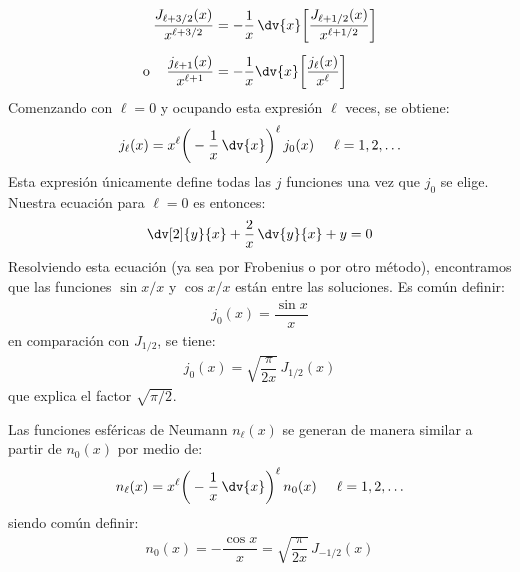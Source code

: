 \begin{align*}
\dfrac{J_{\ell+3/2} (x)}{x^{\ell+3/2}} &= - \dfrac{1}{x} \, \dv{x} \bigg[ \dfrac{J_{\ell+1/2} (x)}{x^{\ell+1/2}} \bigg] \\[0.5em]
\mbox{o } \hspace{0.3cm} \dfrac{j_{\ell+1} (x)}{x^{\ell+1}} &= - \dfrac{1}{x} \dv{x} \bigg[ \dfrac{j_{\ell} (x)}{x^{\ell}} \bigg]
\end{align*}
Comenzando con $\ell = 0$ y ocupando esta expresión $\ell$ veces, se obtiene:
\begin{align*}
j_{\ell} (x) = x^{\ell} \bigg( - \dfrac{1}{x} \, \dv{x} \bigg)^{\ell} \, j_{0} (x) \hspace{0.5cm} \ell = 1, 2, \ldots 
\end{align*}
Esta expresión únicamente define todas las $j$ funciones una vez que $j_{0}$ se elige. Nuestra ecuación para $\ell = 0$ es entonces:
\begin{align*}
\dv[2]{y}{x} + \dfrac{2}{x} \, \dv{y}{x} + y = 0
\end{align*}
Resolviendo esta ecuación (ya sea por Frobenius o por otro método), encontramos que las funciones $\sin x /x$ y $\cos x /x$ están entre las soluciones. Es común definir:
\begin{align*}
j_{0} (x) = \dfrac{\sin x}{x}
\end{align*}
en comparación con $J_{1/2}$, se tiene:
\begin{align*}
j_{0} (x) = \sqrt{\dfrac{\pi}{2 x}} \, J_{1/2} (x)
\end{align*}
que explica el factor $\sqrt{\pi / 2}$.
\par
Las funciones esféricas de Neumann $n_{\ell} (x)$ se generan de manera similar a partir de $n_{0} (x)$ por medio de:
\begin{align*}
n_{\ell} (x) = x^{\ell} \bigg( - \dfrac{1}{x} \, \dv{x} \bigg)^{\ell} \, n_{0} (x) \hspace{0.5cm} \ell = 1, 2, \ldots
\end{align*}
siendo común definir:
\begin{align*}
n_{0} (x) = - \dfrac{\cos x}{x} = \sqrt{\dfrac{\pi}{2 x}} \, J_{-1/2} (x)
\end{align*}

